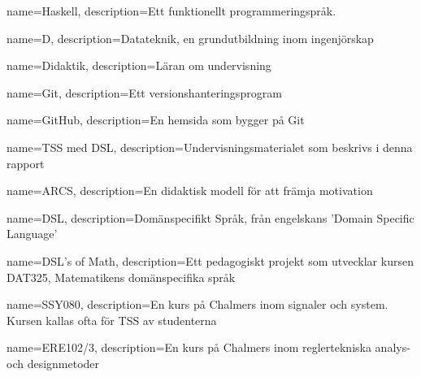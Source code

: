 

{
	name=Haskell,
	description={Ett funktionellt programmeringspråk.}
}

{
    name=D,
    description={Datateknik, en grundutbildning inom ingenjörskap}
}

{
    name=Didaktik,
    description={Läran om undervisning}
}

{
    name=Git,
    description={Ett versionshanteringsprogram}
}

{
    name=GitHub,
    description={En hemsida som bygger på Git}
}

{
    name={TSS med DSL},
    description={Undervisningsmaterialet som beskrivs i denna rapport}
}

{
    name=ARCS,
    description={En didaktisk modell för att främja motivation}
}

{
    name=DSL,
    description={Domänspecifikt Språk, från engelskans 'Domain Specific Language'}
}

{
    name={DSL's of Math},
    description={Ett pedagogiskt projekt som utvecklar kursen DAT325, Matematikens domänspecifika språk}
}

{
    name={SSY080},
    description={En kurs på Chalmers inom signaler och system. Kursen kallas ofta för TSS av studenterna}
}

{
    name={ERE102/3},
    description={En kurs på Chalmers inom reglertekniska analys- och designmetoder}
}







